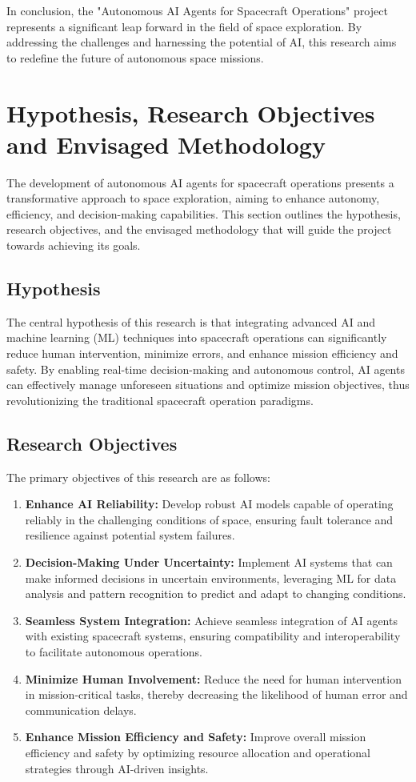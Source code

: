 \documentclass[a4paper, 11pt]{article}
\begin{document}
In conclusion, the "Autonomous AI Agents for Spacecraft Operations" project represents a significant leap forward in the field of space exploration. By addressing the challenges and harnessing the potential of AI, this research aims to redefine the future of autonomous space missions.
\section{Hypothesis, Research Objectives and Envisaged Methodology}

The development of autonomous AI agents for spacecraft operations presents a transformative approach to space exploration, aiming to enhance autonomy, efficiency, and decision-making capabilities. This section outlines the hypothesis, research objectives, and the envisaged methodology that will guide the project towards achieving its goals.

\subsection{Hypothesis}

The central hypothesis of this research is that integrating advanced AI and machine learning (ML) techniques into spacecraft operations can significantly reduce human intervention, minimize errors, and enhance mission efficiency and safety. By enabling real-time decision-making and autonomous control, AI agents can effectively manage unforeseen situations and optimize mission objectives, thus revolutionizing the traditional spacecraft operation paradigms.

\subsection{Research Objectives}

The primary objectives of this research are as follows:

\begin{enumerate}
    \item \textbf{Enhance AI Reliability:} Develop robust AI models capable of operating reliably in the challenging conditions of space, ensuring fault tolerance and resilience against potential system failures.
    \item \textbf{Decision-Making Under Uncertainty:} Implement AI systems that can make informed decisions in uncertain environments, leveraging ML for data analysis and pattern recognition to predict and adapt to changing conditions.
    \item \textbf{Seamless System Integration:} Achieve seamless integration of AI agents with existing spacecraft systems, ensuring compatibility and interoperability to facilitate autonomous operations.
    \item \textbf{Minimize Human Involvement:} Reduce the need for human intervention in mission-critical tasks, thereby decreasing the likelihood of human error and communication delays.
    \item \textbf{Enhance Mission Efficiency and Safety:} Improve overall mission efficiency and safety by optimizing resource allocation and operational strategies through AI-driven insights.
\end{enumerate}
\end{document}
